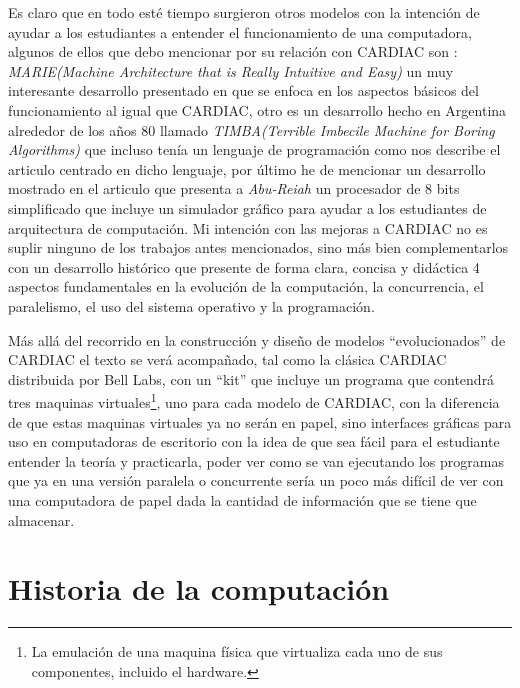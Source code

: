 \documentclass[letterpaper,12pt,oneside]{book}
\begin{document}
	Es claro que en todo esté tiempo surgieron otros modelos con la intención de ayudar a los estudiantes a entender el funcionamiento de una computadora, algunos
	de ellos que debo mencionar por su relación con CARDIAC son : \textit{MARIE(Machine Architecture that is Really Intuitive and Easy)} un muy interesante 
	desarrollo presentado en \cite{null_essentials_2003} que se enfoca en los aspectos básicos del funcionamiento al igual que CARDIAC, otro es un desarrollo
	hecho en Argentina alrededor de los años 80 llamado \textit{TIMBA(Terrible Imbecile Machine for Boring Algorithms)} que incluso tenía un lenguaje de programación
	como nos describe el articulo \cite{alvaro_frias_retruco_2022} centrado en dicho lenguaje, por último he de mencionar un desarrollo
	mostrado en el articulo \cite{ajdari_design_2012} que presenta a \textit{Abu-Reiah} un procesador de 8 bits simplificado que incluye un simulador 
	gráfico
	para ayudar a los estudiantes de arquitectura de computación. Mi intención con las mejoras a CARDIAC no es suplir ninguno de los trabajos antes mencionados,
	sino más bien complementarlos con un desarrollo histórico que presente de forma clara, concisa y didáctica 4 aspectos fundamentales en la evolución
	de la computación, la concurrencia, el paralelismo, el uso del sistema operativo y la programación.
	
	
	Más allá del recorrido en la construcción y diseño de modelos ``evolucionados'' de CARDIAC el texto se verá acompañado,
	tal como la clásica CARDIAC distribuida por Bell Labs, con un ``kit'' que incluye un programa que contendrá tres maquinas virtuales\footnote{La emulación de una
	maquina física que virtualiza cada uno de sus componentes, incluido el hardware.}, uno para cada
	modelo de CARDIAC, con la diferencia de que estas maquinas virtuales ya no serán en papel, sino interfaces gráficas para uso en computadoras de escritorio con la idea de 
	que sea fácil para el estudiante
	entender la teoría y practicarla, poder ver como se van ejecutando los programas que ya en una versión paralela o concurrente sería un poco más difícil de ver con una 
	computadora de papel dada la cantidad de información que se tiene que almacenar.
	


\tableofcontents
\listoffigures

\mainmatter

\chapter{Historia de la computación} %
\end{document}
